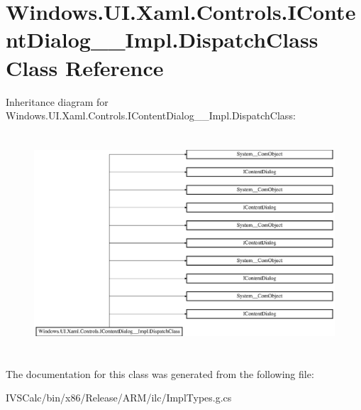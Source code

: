 \hypertarget{class_windows_1_1_u_i_1_1_xaml_1_1_controls_1_1_i_content_dialog_____impl_1_1_dispatch_class}{}\section{Windows.\+U\+I.\+Xaml.\+Controls.\+I\+Content\+Dialog\+\_\+\+\_\+\+Impl.\+Dispatch\+Class Class Reference}
\label{class_windows_1_1_u_i_1_1_xaml_1_1_controls_1_1_i_content_dialog_____impl_1_1_dispatch_class}
Inheritance diagram for Windows.\+U\+I.\+Xaml.\+Controls.\+I\+Content\+Dialog\+\_\+\+\_\+\+Impl.\+Dispatch\+Class\+:\begin{figure}[H]
\begin{center}
\leavevmode
\includegraphics[height=8.235293cm]{class_windows_1_1_u_i_1_1_xaml_1_1_controls_1_1_i_content_dialog_____impl_1_1_dispatch_class}
\end{center}
\end{figure}


The documentation for this class was generated from the following file\+:\begin{DoxyCompactItemize}
\item 
I\+V\+S\+Calc/bin/x86/\+Release/\+A\+R\+M/ilc/Impl\+Types.\+g.\+cs\end{DoxyCompactItemize}
